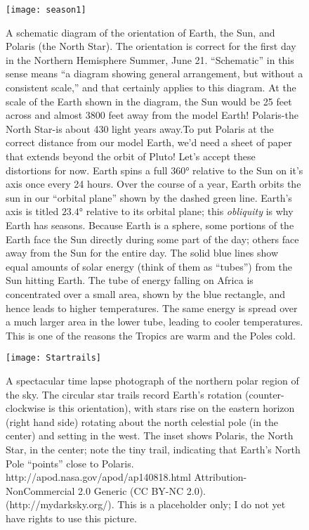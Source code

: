 \documentclass[amstex,12pt]{book}
\begin{document}
\begin{figure}[p]
\centering
\texttt{[image: season1]}%
\caption{A schematic diagram of the orientation of Earth, the Sun, and Polaris (the North Star). The orientation is correct for the first day in the Northern Hemisphere Summer, June 21. ``Schematic'' in this sense means ``a diagram showing general arrangement, but without a consistent scale,'' and that certainly applies to this diagram. At the scale of the Earth shown in the diagram, the Sun would be 25 feet across and almost 3800 feet away from the model Earth! Polaris-the North Star-is about 430 light years away.To put Polaris at the correct distance from our model Earth, we'd need a sheet of paper that extends beyond the orbit of Pluto! Let's accept these distortions for now. Earth spins a full $\ang{360}$ relative to the Sun on it's axis once every 24 hours. Over the course of a year, Earth orbits the sun in our ``orbital plane'' shown by the dashed green line. Earth's axis is titled $\ang{23.4}$ relative to its orbital plane; this \emph{obliquity} is why Earth has seasons. Because Earth is a sphere, some portions of the Earth face the Sun directly during some part of the day; others face away from the Sun for the entire day. The solid blue lines show equal amounts of solar energy (think of them as ``tubes'') from the Sun hitting Earth. The tube of energy falling on Africa is concentrated over a small area, shown by the blue rectangle, and hence leads to higher temperatures. The same energy is spread over a much larger area in the lower tube, leading to cooler temperatures. This is one of the reasons the Tropics are warm and the Poles cold.}   
\label{fig:season1}
\end{figure}

\newpage
\begin{sidewaysfigure}
\centering
\texttt{[image: Startrails]}%
\caption{A spectacular time lapse photograph of the northern polar region of the sky. The circular star trails record Earth's rotation (counter-clockwise is this orientation), with stars rise on the eastern horizon (right hand side) rotating about the north celestial pole (in the center) and setting in the west. The inset shows Polaris, the North Star, in the center; note the tiny trail, indicating that Earth’s North Pole ``points'' close to Polaris. http://apod.nasa.gov/apod/ap140818.html  Attribution-NonCommercial 2.0 Generic (CC BY-NC 2.0). (http://mydarksky.org/). This is a placeholder only; I do not yet have rights to use this picture. }
\label{fig:startrails}
\end{sidewaysfigure}
\end{document}

